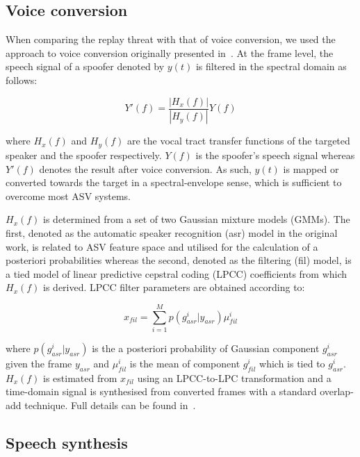 \subsection{Voice conversion}
\label{ssec:vconv}

When comparing the replay threat with that of voice conversion, we used the approach to voice conversion originally presented in~\cite{Matrouf2005}. At the frame level, the speech signal of a spoofer denoted by $y(t)$ is filtered in the spectral domain as follows:

\begin{equation}
Y'(f) = \frac{\left|H_{x}(f)\right|}{\left|H_{y}(f)\right|}Y(f)
\label{eq:conversioneq}
\end{equation}

\noindent where $H_{x}(f)$ and $H_{y}(f)$ are the vocal tract transfer functions of the targeted speaker and the spoofer respectively.  $Y(f)$ is the spoofer's speech signal whereas $Y'(f)$ denotes the result after voice conversion.  As such, $y(t)$ is mapped or converted towards the target in a spectral-envelope sense, which is sufficient to overcome most ASV systems. 

$H_x(f)$ is determined from a set of two Gaussian mixture models (GMMs).  The first, denoted as the automatic speaker recognition (asr) model in the original work, is related to ASV feature space and utilised for the calculation of a posteriori probabilities whereas the second, denoted as the filtering (fil) model, is a tied model of linear predictive cepstral coding (LPCC) coefficients from which $H_x(f)$ is derived.  LPCC filter parameters are obtained according to:

\begin{equation}
x_{fil} = \sum\limits_{i=1}^{M}p(g_{asr}^{i}|y_{asr}) \mu_{fil}^{i}
\label{eq:EMit}
\end{equation}

\noindent where $p(g_{asr}^{i}|y_{asr})$ is the a posteriori probability of Gaussian component $g_{asr}^{i}$ given the frame $y_{asr}$ and $\mu_{fil}^{i}$ is the mean of component $g_{fil}^{i}$ which is tied to $g_{asr}^{i}$.  $H_{x}(f)$ is estimated from $x_{fil}$ using an LPCC-to-LPC transformation and a time-domain signal is synthesised from converted frames with a standard overlap-add technique. Full details can be found in~\cite{Matrouf2005,Bonastre2006,Bonastre2007}.


\subsection{Speech synthesis}

